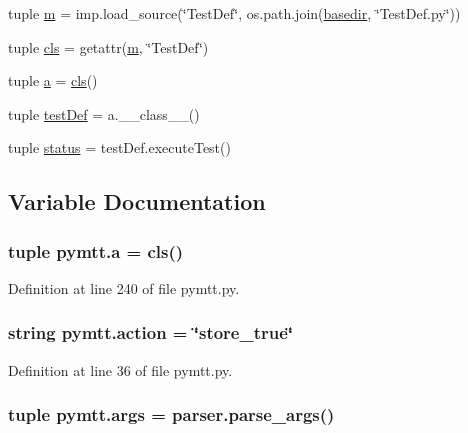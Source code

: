 \begin{DoxyCompactItemize}
\item 
tuple \hyperlink{namespacepymtt_ab13a60c31fa69917ce06c1a2631aaf02}{m} = imp.\-load\-\_\-source(\char`\"{}Test\-Def\char`\"{}, os.\-path.\-join(\hyperlink{namespacepymtt_a968aa7c33a2106380483390a0fa2a045}{basedir}, \char`\"{}Test\-Def.\-py\char`\"{}))
\item 
tuple \hyperlink{namespacepymtt_a17f658b5d141d51664bb3ede8830c4c0}{cls} = getattr(\hyperlink{namespacepymtt_ab13a60c31fa69917ce06c1a2631aaf02}{m}, \char`\"{}Test\-Def\char`\"{})
\item 
tuple \hyperlink{namespacepymtt_a55825c16c4bd231f7ffbd0fe52407e3f}{a} = \hyperlink{namespacepymtt_a17f658b5d141d51664bb3ede8830c4c0}{cls}()
\item 
tuple \hyperlink{namespacepymtt_afebe539e6104da8ebd3d06b7a0e77fe7}{test\-Def} = a.\-\_\-\-\_\-class\-\_\-\-\_\-()
\item 
tuple \hyperlink{namespacepymtt_a7ab538ba889839f62b313c79930d4575}{status} = test\-Def.\-execute\-Test()
\end{DoxyCompactItemize}


\subsection{Variable Documentation}
\hypertarget{namespacepymtt_a55825c16c4bd231f7ffbd0fe52407e3f}{
\subsubsection[{a}]{\setlength{\rightskip}{0pt plus 5cm}tuple pymtt.\-a = {\bf cls}()}}\label{namespacepymtt_a55825c16c4bd231f7ffbd0fe52407e3f}


Definition at line 240 of file pymtt.\-py.

\hypertarget{namespacepymtt_a5ee564a034624d925bb8dc823d11c522}{
\subsubsection[{action}]{\setlength{\rightskip}{0pt plus 5cm}string pymtt.\-action = \char`\"{}store\-\_\-true\char`\"{}}}\label{namespacepymtt_a5ee564a034624d925bb8dc823d11c522}


Definition at line 36 of file pymtt.\-py.

\hypertarget{namespacepymtt_adec79fec8fbc6630a3a485916f342683}{
\subsubsection[{args}]{\setlength{\rightskip}{0pt plus 5cm}tuple pymtt.\-args = parser.\-parse\-\_\-args()}}\label{namespacepymtt_adec79fec8fbc6630a3a485916f342683}


